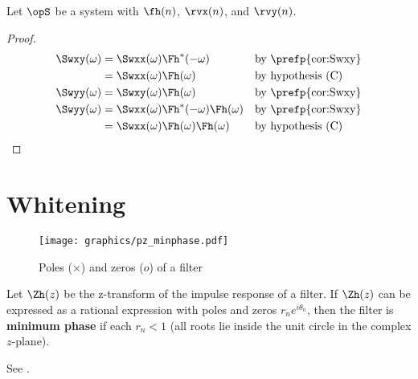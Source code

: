 \begin{corollary}
\label{cor:Swxy}
Let $\opS$ be a system with  $\fh(n)$, 
 $\rvx(n)$, and  $\rvy(n)$.
\end{corollary}
\begin{proof}
\begin{align*}
   \Swxy(\omega)
     &= \Swxx(\omega) \Fh^\ast(-\omega)
     && \text{by \prefp{cor:Swxy}}
   \\&= \Swxx(\omega) \Fh(\omega)
     && \text{by hypothesis (C)}
   \\
   \Swyy(\omega)
     &= \Swxy(\omega) \Fh(\omega)
     && \text{by \prefp{cor:Swxy}}
   \\
   \Swyy(\omega)
     &= \Swxx(\omega) \Fh^\ast(-\omega) \Fh(\omega)
     && \text{by \prefp{cor:Swxy}}
   \\&= \Swxx(\omega) \Fh(\omega) \Fh(\omega)
     && \text{by hypothesis (C)}
\end{align*}
\end{proof}

\section{Whitening}
\label{sec:d-whiten}
\begin{figure}[h]
  \centering
  \texttt{[image: graphics/pz\_minphase.pdf]}
  \caption{
     Poles ($\times$) and zeros ($o$) of a  filter
     \label{fig:w_pz_minphase}
     }
\end{figure}
\begin{definition}
Let $\Zh(z)$ be the z-transform of the impulse response of a filter.
If $\Zh(z)$ can be expressed as a rational expression with poles and zeros
$r_ne^{i\theta_n}$,
then the filter is \textbf{minimum phase} if each $r_n<1$
(all roots lie inside the unit circle in the complex $z$-plane).
\end{definition}
See .

